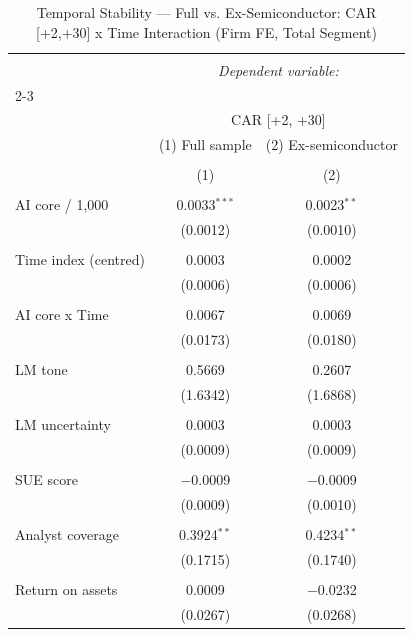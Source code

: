 
\begin{table}[!htbp] \centering 
  \caption{Temporal Stability — Full vs. Ex-Semiconductor: CAR [+2,+30] x Time Interaction (Firm FE, Total Segment)} 
  \label{} 
\begin{tabular}{@{\extracolsep{5pt}}lcc} 
\\[-1.8ex]\hline 
\hline \\[-1.8ex] 
 & \multicolumn{2}{c}{\textit{Dependent variable:}} \\ 
\cline{2-3} 
\\[-1.8ex] & \multicolumn{2}{c}{CAR [+2, +30]} \\ 
 & (1) Full sample & (2) Ex-semiconductor \\ 
\\[-1.8ex] & (1) & (2)\\ 
\hline \\[-1.8ex] 
 AI core / 1,000 & 0.0033$^{***}$ & 0.0023$^{**}$ \\ 
  & (0.0012) & (0.0010) \\ 
  & & \\ 
 Time index (centred) & 0.0003 & 0.0002 \\ 
  & (0.0006) & (0.0006) \\ 
  & & \\ 
 AI core x Time & 0.0067 & 0.0069 \\ 
  & (0.0173) & (0.0180) \\ 
  & & \\ 
 LM tone & 0.5669 & 0.2607 \\ 
  & (1.6342) & (1.6868) \\ 
  & & \\ 
 LM uncertainty & 0.0003 & 0.0003 \\ 
  & (0.0009) & (0.0009) \\ 
  & & \\ 
 SUE score & $-$0.0009 & $-$0.0009 \\ 
  & (0.0009) & (0.0010) \\ 
  & & \\ 
 Analyst coverage & 0.3924$^{**}$ & 0.4234$^{**}$ \\ 
  & (0.1715) & (0.1740) \\ 
  & & \\ 
 Return on assets & 0.0009 & $-$0.0232 \\ 
  & (0.0267) & (0.0268) \\ 

\end{tabular}
\end{table}
